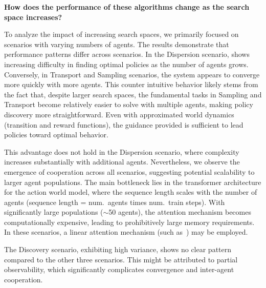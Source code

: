 \begin{center}
 \textbf{How does the performance of these algorithms change as the search space increases?}
\end{center}
To analyze the impact of increasing search spaces, we primarily focused on scenarios with varying numbers of agents. The results demonstrate that performance patterns differ across scenarios. In the Dispersion scenario, \fname{} shows increasing difficulty in finding optimal policies as the number of agents grows. Conversely, in Transport and Sampling scenarios, the system appears to converge more quickly with more agents. This counter intuitive behavior likely stems from the fact that, despite larger search spaces, the fundamental tasks in Sampling and Transport become relatively easier to solve with multiple agents, making policy discovery more straightforward. Even with approximated world dynamics (transition and reward functions), the guidance provided is sufficient to lead policies toward optimal behavior.

This advantage does not hold in the Dispersion scenario, where complexity increases substantially with additional agents. Nevertheless, we observe the emergence of cooperation across all scenarios, suggesting potential scalability to larger agent populations. The main bottleneck lies in the transformer architecture for the action world model, where the sequence length scales with the number of agents (sequence length = num.\ agents times num.\ train steps). With significantly large populations ($\sim$50 agents), the attention mechanism becomes computationally expensive, leading to prohibitively large memory requirements. In these scenarios, a linear attention mechanism (such as~\cite{Beltagy20}) may be employed.

The Discovery scenario, exhibiting high variance, shows no clear pattern compared to the other three scenarios.
This might be attributed to partial observability, which significantly complicates convergence and inter-agent cooperation.
